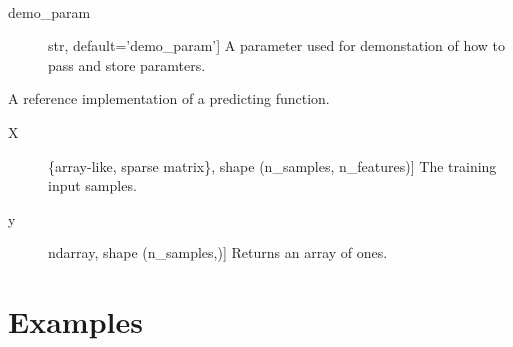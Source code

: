 \documentclass[letterpaper,10pt,english]{sphinxmanual}
\begin{document}
\begin{fulllineitems}
\label{\detokenize{sections/prediction:IDL.IDLModel}}~\begin{description}
\item[{demo\_param}] \leavevmode{[}str, default=’demo\_param’{]}
A parameter used for demonstation of how to pass and store paramters.

\end{description}

\begin{fulllineitems}
\label{\detokenize{sections/prediction:IDL.IDLModel.predict}}
A reference implementation of a predicting function.
\begin{description}
\item[{X}] \leavevmode{[}\{array-like, sparse matrix\}, shape (n\_samples, n\_features){]}
The training input samples.

\end{description}
\begin{description}
\item[{y}] \leavevmode{[}ndarray, shape (n\_samples,){]}
Returns an array of ones.

\end{description}

\end{fulllineitems}


\end{fulllineitems}



\chapter{Examples}
\label{\detokenize{sections/classification_operational_example:examples}}\label{\detokenize{sections/classification_operational_example::doc}}

\section{}
\label{\detokenize{sections/classification_operational_example:classification-mnist}}
\end{document}
